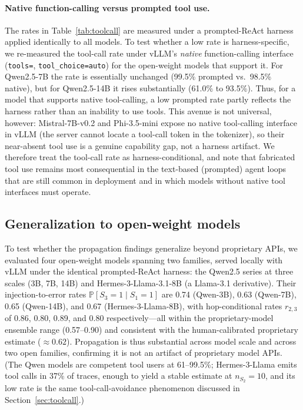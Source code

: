 \documentclass{article}
\renewcommand{\Pr}{\mathbb{P}}
\begin{document}
\paragraph{Native function-calling versus prompted tool use.}
The rates in Table~\ref{tab:toolcall} are measured under a prompted-ReAct
harness applied identically to all models. To test whether a low rate is
harness-specific, we re-measured the tool-call rate under vLLM's \emph{native}
function-calling interface (\texttt{tools=}, \texttt{tool\_choice=auto}) for the
open-weight models that support it. For Qwen2.5-7B the rate is essentially
unchanged (99.5\% prompted vs.\ 98.5\% native), but for Qwen2.5-14B it rises
substantially (61.0\% to 93.5\%). Thus, for a model that supports native
tool-calling, a low prompted rate partly reflects the harness rather than an
inability to use tools. This avenue is not universal, however:
Mistral-7B-v0.2 and Phi-3.5-mini expose no native tool-calling interface in
vLLM (the server cannot locate a tool-call token in the tokenizer), so their
near-absent tool use is a genuine capability gap, not a harness artifact. We
therefore treat the tool-call rate as harness-conditional, and note that
fabricated tool use remains most consequential in the text-based (prompted)
agent loops that are still common in deployment and in which models without
native tool interfaces must operate.

\subsection{Generalization to open-weight models}
\label{sec:openweight}

To test whether the propagation findings generalize beyond proprietary APIs, we
evaluated four open-weight models spanning two families, served locally with
vLLM under the identical prompted-ReAct harness: the Qwen2.5 series at three
scales (3B, 7B, 14B) and Hermes-3-Llama-3.1-8B (a Llama-3.1 derivative). Their
injection-to-error rates $\Pr[S_3{=}1 \mid S_1{=}1]$ are 0.74 (Qwen-3B), 0.63
(Qwen-7B), 0.65 (Qwen-14B), and 0.67 (Hermes-3-Llama-8B), with hop-conditional
rates $r_{2,3}$ of 0.86, 0.80, 0.89, and 0.80 respectively---all within the
proprietary-model ensemble range (0.57--0.90) and consistent with the
human-calibrated proprietary estimate ($\approx 0.62$). Propagation is thus
substantial across model scale and across two open families, confirming it is
not an artifact of proprietary model APIs. (The Qwen models are competent tool
users at 61--99.5\%; Hermes-3-Llama emits tool calls in 37\% of traces, enough
to yield a stable estimate at $n_{S_2}{=}10$, and its low rate is the same
tool-call-avoidance phenomenon discussed in Section~\ref{sec:toolcall}.)
\end{document}
